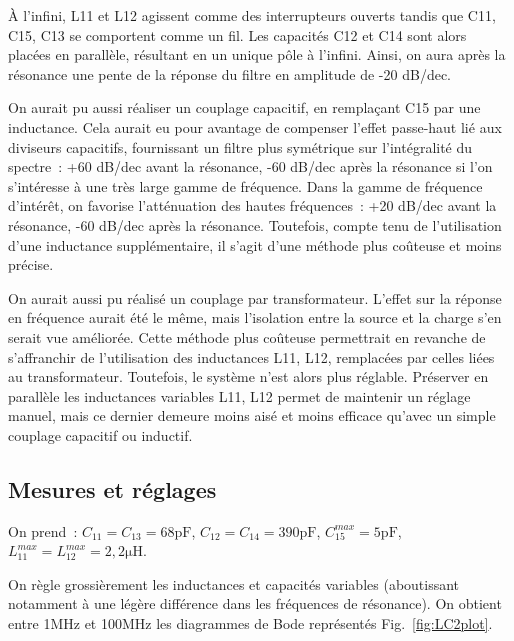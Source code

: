 \documentclass{article}
\begin{document}
À l'infini, L11 et L12 agissent comme des interrupteurs ouverts tandis que C11, C15, C13 se comportent comme un fil. Les capacités C12 et C14 sont alors placées en parallèle, résultant en un unique pôle à l'infini. Ainsi, on aura après la résonance une pente de la réponse du filtre en amplitude de -20 dB/dec.



On aurait pu aussi réaliser un couplage capacitif, en remplaçant C15 par une inductance. Cela aurait eu pour avantage de compenser l'effet passe-haut lié aux diviseurs capacitifs, fournissant un filtre plus symétrique sur l'intégralité du spectre~: +60 dB/dec avant la résonance, -60 dB/dec après la résonance si l'on s'intéresse à une très large gamme de fréquence. Dans la gamme de fréquence d'intérêt, on favorise l'atténuation des hautes fréquences~: +20 dB/dec avant la résonance, -60 dB/dec après la résonance. Toutefois, compte tenu de l'utilisation d'une inductance supplémentaire, il s'agit d'une méthode plus coûteuse et moins précise.

On aurait aussi pu réalisé un couplage par transformateur. L'effet sur la réponse en fréquence aurait été le même, mais l'isolation entre la source et la charge s'en serait vue améliorée. Cette méthode plus coûteuse permettrait en revanche de s'affranchir de l'utilisation des inductances L11, L12, remplacées par celles liées au transformateur. Toutefois, le système n'est alors plus réglable. Préserver en parallèle les inductances variables L11, L12 permet de maintenir un réglage manuel, mais ce dernier demeure moins aisé et moins efficace qu'avec un simple couplage capacitif ou inductif.





\subsection{Mesures et réglages}


On prend~: $C_{11}=C_{13}=68\mathrm{pF}$, $C_{12}=C_{14}=390\mathrm{pF}$, $C_{15}^{max}=5\mathrm{pF}$, $L_{11}^{max}=L_{12}^{max}=2,2\mathrm{\mu H}$.

On règle grossièrement les inductances et capacités variables (aboutissant notamment à une légère différence dans les fréquences de résonance). On obtient entre 1MHz et 100MHz les diagrammes de Bode représentés Fig.~\ref{fig:LC2plot}.
\end{document}
